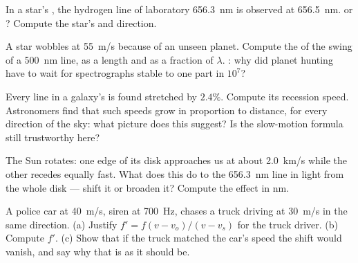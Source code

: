 \begin{exercise}[$\star\star$]\label{exo:g12:doppler-effect:11}
In a star's , the hydrogen line of laboratory  \qty{656.3}{nm} is observed
at \qty{656.5}{nm}.  or ? Compute the star's  and direction.
\end{exercise}

\begin{exercise}[$\star\star\star$]\label{exo:g12:doppler-effect:12}
A star wobbles at \qty{55}{m/s} because of an unseen planet. Compute the  of the
 swing of a \qty{500}{nm} line, as a length and as a fraction of $\lambda$. : why did planet hunting have to wait for spectrographs stable to one part in
$10^{7}$?
\end{exercise}

\begin{exercise}[$\star\star\star$]\label{exo:g12:doppler-effect:13}
Every line in a galaxy's  is found stretched by $2.4\%$. Compute its recession speed.
Astronomers find that such speeds grow in proportion to distance, for every direction of the
sky: what picture does this suggest? Is the slow-motion formula still trustworthy here?
\end{exercise}

\begin{exercise}[$\star\star\star$]\label{exo:g12:doppler-effect:14}
The Sun rotates: one edge of its disk approaches us at about \qty{2.0}{km/s} while the other
recedes equally fast. What does this do to the \qty{656.3}{nm} line in light from the whole
disk --- shift it or broaden it? Compute the effect in \unit{nm}.
\end{exercise}

\begin{exercise}[$\star\star\star$]\label{exo:g12:doppler-effect:15}
A police car at \qty{40}{m/s}, siren at \qty{700}{Hz}, chases a truck driving at \qty{30}{m/s}
in the same direction. (a) Justify $f' = f(v - v_o)/(v - v_s)$ for the truck driver.
(b) Compute $f'$. (c) Show that if the truck matched the car's speed the shift would vanish,
and say why that is as it should be.
\end{exercise}

